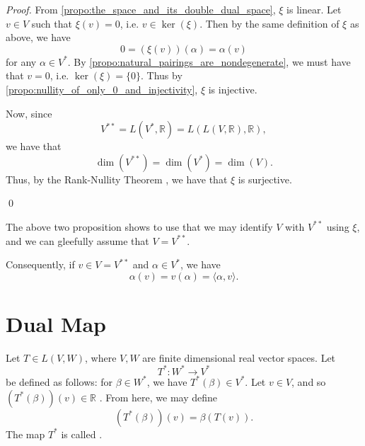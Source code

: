 \documentclass[notoc,notitlepage]{tufte-book}
\begin{document}
\begin{proof}
  From \cref{propo:the_space_and_its_double_dual_space}, $\xi$ is linear.
  Let $v \in V$ such that $\xi(v) = 0$, i.e. $v \in \ker(\xi)$.
  Then by the same definition of $\xi$ as above, we have
  \begin{equation*}
    0 = (\xi(v))(\alpha) = \alpha(v)
  \end{equation*}
  for any $\alpha \in V^*$.
  By \cref{propo:natural_pairings_are_nondegenerate}, we must have that $v = 0$,
  i.e. $\ker(\xi) = \{ 0 \}$.
  Thus by \cref{propo:nullity_of_only_0_and_injectivity}, $\xi$ is injective.

  Now, since
  \begin{equation*}
    V^{**} = L(V^*, \mathbb{R}) = L ( L ( V, \mathbb{R} ), \mathbb{R} ),
  \end{equation*}
  we have that
  \begin{equation*}
    \dim(V^{**}) = \dim(V^*) = \dim(V).
  \end{equation*}
  Thus, by the Rank-Nullity Theorem
  ,
  we have that $\xi$ is surjective.

  \qed\
\end{proof}

The above two proposition shows to use that we may
identify $V$ with $V^{**}$ using $\xi$, and we can
gleefully assume that $V = V^{**}$.

Consequently, if $v \in V = V^{**}$ and $\alpha \in V^*$,
we have
\begin{equation}\label{eq:commutativity_of_the_vector_and_its_linear_operator}
  \alpha(v) = v(\alpha) = \langle \alpha, v \rangle.
\end{equation}


\section{Dual Map}%
\label{sec:dual_map}

\begin{defn}[Dual Map]\label{defn:dual_map}
  Let $T \in L(V, W)$, where $V, W$ are finite dimensional real vector spaces. Let
  \begin{equation*}
    T^* : W^* \to V^*
  \end{equation*}
  be defined as follows: for $\beta \in W^*$, we have $T^*(\beta) \in V^*$.
  Let $v \in V$, and so $(T^*(\beta))(v) \in \mathbb{R}$
  .
  From here, we may define
  \begin{equation*}
    (T^*(\beta))(v) = \beta(T(v)).
  \end{equation*}
  The map $T^*$ is called .
\end{defn}
\end{document}
